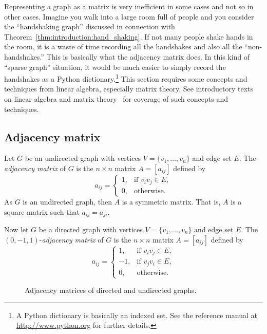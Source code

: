 Representing a graph as a matrix is very inefficient in some cases and
not so in other cases. Imagine you walk into a large room full of
people and you consider the ``handshaking graph'' discussed in
connection with Theorem~\ref{thm:introduction:hand_shaking}. If not
many people shake hands in the room, it is a waste of time recording
all the handshakes and also all the ``non-handshakes.'' This is
basically what the adjacency matrix does. In this kind of
``sparse graph'' situation, it would be much
easier to simply record the handshakes as a Python
dictionary.\footnote{
  A Python dictionary is basically an indexed set. See
  the reference manual at \url{http://www.python.org} for further
  details.
}
This section requires some concepts and techniques from linear
algebra, especially matrix theory. See introductory texts on linear
algebra and matrix theory~\cite{Beezer2009} for coverage of such
concepts and techniques.



\subsection{Adjacency matrix}

Let $G$ be an undirected graph with vertices
$V = \{ v_1, \dots, v_n \}$ and edge set $E$. The
\emph{adjacency matrix} of $G$ is the $n \times n$ matrix
$A = [a_{ij}]$ defined by
\[
a_{ij}
=
\begin{cases}
1, & \text{if $v_i v_j \in E$}, \\
0, & \text{otherwise}.
\end{cases}
\]
As $G$ is an undirected graph, then $A$ is a symmetric matrix. That
is, $A$ is a square matrix such that $a_{ij} = a_{ji}$.

Now let $G$ be a directed graph with vertices
$V = \{ v_1, \dots, v_n \}$ and edge set $E$. The
$(0, -1, 1)$-\emph{adjacency matrix} of $G$ is the $n \times n$ matrix
$A = [a_{ij}]$ defined by
\[
a_{ij}
=
\begin{cases}
1,  & \text{if $v_i v_j \in E$}, \\
-1, & \text{if $v_j v_i \in E$}, \\
0,  & \text{otherwise}.
\end{cases}
\]

\begin{figure}[!htbp]
\centering

\caption{Adjacency matrices of directed and undirected graphs.}
\label{fig:introduction:adjacency_matrices}
\end{figure}

